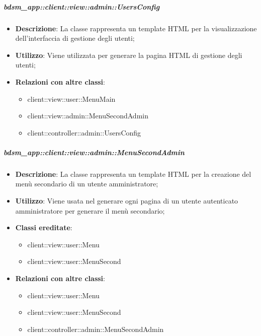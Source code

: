 		\subparagraph{bdsm\_app::client::view::admin::UsersConfig} %
		\label{subp:bdsm_app_client_view_admin_usersconfig}
			\begin{itemize}
				\item \textbf{Descrizione}: La classe rappresenta un template HTML per la visualizzazione dell'interfaccia di gestione degli utenti;
				\item \textbf{Utilizzo}: Viene utilizzata per generare la pagina HTML di gestione degli utenti;
				\item \textbf{Relazioni con altre classi}: 		
					\begin{itemize}
						\item client::view::user::MenuMain
						\item client::view::admin::MenuSecondAdmin
						\item client::controller::admin::UsersConfig
					\end{itemize}
			\end{itemize}

		\subparagraph{bdsm\_app::client::view::admin::MenuSecondAdmin} %
		\label{subp:bdsm_app_client_view_admin_menusecondadmin}
			\begin{itemize}
				\item \textbf{Descrizione}: La classe rappresenta un template HTML per la creazione del menù secondario di un utente amministratore;
				\item \textbf{Utilizzo}: Viene usata nel generare ogni pagina di un utente autenticato amministratore per generare il menù secondario;
				\item \textbf{Classi ereditate}: 				
					\begin{itemize}
						\item client::view::user::Menu		
						\item client::view::user::MenuSecond					
					\end{itemize}
				\item \textbf{Relazioni con altre classi}: 		
					\begin{itemize}
						\item client::view::user::Menu
						\item client::view::user::MenuSecond
						\item client::controller::admin::MenuSecondAdmin	
					\end{itemize}
			\end{itemize}


